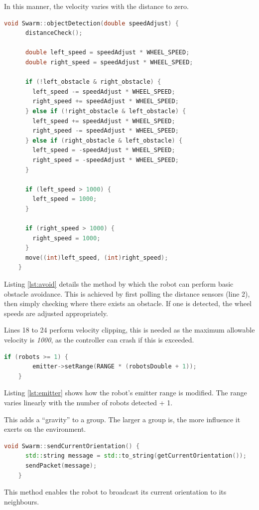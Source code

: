 In this manner, the velocity varies with the distance to zero.

\begin{lstlisting}[language=C++, caption={Object avoidance},label={lst:avoid}]
	void Swarm::objectDetection(double speedAdjust) {
	  distanceCheck();

	  double left_speed = speedAdjust * WHEEL_SPEED;
	  double right_speed = speedAdjust * WHEEL_SPEED;

	  if (!left_obstacle & right_obstacle) {
	    left_speed -= speedAdjust * WHEEL_SPEED;
	    right_speed += speedAdjust * WHEEL_SPEED;
	  } else if (!right_obstacle & left_obstacle) {
	    left_speed += speedAdjust * WHEEL_SPEED;
	    right_speed -= speedAdjust * WHEEL_SPEED;
	  } else if (right_obstacle & left_obstacle) {
	    left_speed = -speedAdjust * WHEEL_SPEED;
	    right_speed = -speedAdjust * WHEEL_SPEED;
	  }

	  if (left_speed > 1000) {
	    left_speed = 1000;
	  }

	  if (right_speed > 1000) {
	    right_speed = 1000;
	  }
	  move((int)left_speed, (int)right_speed);
	}
\end{lstlisting}

Listing \ref{lst:avoid} details the method by which the robot can perform basic obstacle avoidance. This is achieved by first polling the distance sensors (line 2), then simply checking where there exists an obstacle. If one is detected, the wheel speeds are adjusted appropriately.

Lines 18 to 24 perform velocity clipping, this is needed as the maximum allowable velocity is \textit{1000}, as the controller can crash if this is exceeded.

\begin{lstlisting}[language=C++, caption={Emitter range manipulation},label={lst:emitter}]
	if (robots >= 1) {
		emitter->setRange(RANGE * (robotsDouble + 1));
	}
\end{lstlisting}

Listing \ref{lst:emitter} shows how the robot's emitter range is modified. The range varies linearly with the number of robots detected + 1.

This adds a ``gravity''
to a group. The larger a group is, the more influence it exerts on the environment.
\clearpage

\begin{lstlisting}[language=C++, caption={Broadcast current orientation},label={lst:broadcast}]
	void Swarm::sendCurrentOrientation() {
	  std::string message = std::to_string(getCurrentOrientation());
	  sendPacket(message);
	}
\end{lstlisting}

This method enables the robot to broadcast its current orientation to its neighbours.
